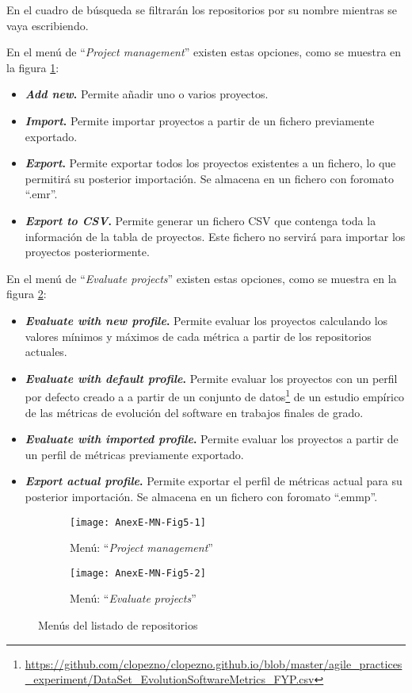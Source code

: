 En el cuadro de búsqueda se filtrarán los repositorios por su nombre mientras se vaya escribiendo.

En el menú de ``\textit{Project management}'' existen estas opciones, como se muestra en la figura \ref{fig:AnexE-MN-Fig5-1}:
\begin{itemize}
	\item \textbf{\textit{Add new}.} Permite añadir uno o varios proyectos.
	\item \textbf{\textit{Import}.} Permite importar proyectos a partir de un fichero previamente exportado.
	\item \textbf{\textit{Export}.} Permite exportar todos los proyectos existentes a un fichero, lo que permitirá su posterior importación. Se almacena en un fichero con foromato ``.emr''.
	\item \textbf{\textit{Export to CSV}.} Permite generar un fichero CSV que contenga toda la información de la tabla de proyectos. Este fichero no servirá para importar los proyectos posteriormente.
\end{itemize}
En el menú de ``\textit{Evaluate projects}'' existen estas opciones, como se muestra en la figura \ref{fig:AnexE-MN-Fig5-2}:
\begin{itemize}
	\item \textbf{\textit{Evaluate with new profile}.} Permite evaluar los proyectos calculando los valores mínimos y máximos de cada métrica a partir de los repositorios actuales.
	\item \textbf{\textit{Evaluate with default profile}.} Permite evaluar los proyectos con un perfil por defecto creado a a partir de un conjunto de datos\footnote{\url{https://github.com/clopezno/clopezno.github.io/blob/master/agile_practices_experiment/DataSet_EvolutionSoftwareMetrics_FYP.csv}} de un estudio empírico de las métricas de evolución del software en trabajos finales de grado\cite{lopez_portal_2019}.
	\item \textbf{\textit{Evaluate with imported profile}.} Permite evaluar los proyectos a partir de un perfil de métricas previamente exportado.
	\item \textbf{\textit{Export actual profile}.} Permite exportar el perfil de métricas actual para su posterior importación. Se almacena en un fichero con foromato ``.emmp''.
\end{itemize}
\begin{figure}[!h]
	\centering
	\begin{subfigure}{.45\textwidth}
		\centering
		\texttt{[image: AnexE-MN-Fig5-1]}
		\caption{Menú: ``\textit{Project management}''}
		\label{fig:AnexE-MN-Fig5-1}
	\end{subfigure}\hfill
	\begin{subfigure}{.45\textwidth}
		\centering
		\texttt{[image: AnexE-MN-Fig5-2]}
		\caption{Menú: ``\textit{Evaluate projects}''}
		\label{fig:AnexE-MN-Fig5-2}
	\end{subfigure}
	\caption{Menús del listado de repositorios}
	\label{fig:AnexE-MN-Fig5}
\end{figure}


